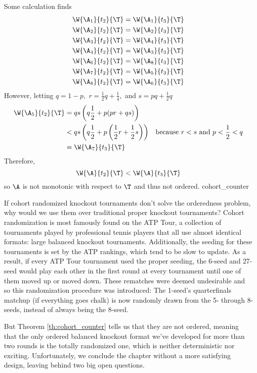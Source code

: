 {{        Some calculation finds
        \begin{align*}
            \W{\A_1}{t_2}{\T} &= \W{\A_1}{t_3}{\T}\\
            \W{\A_2}{t_2}{\T} &= \W{\A_2}{t_3}{\T}\\
            \W{\A_3}{t_2}{\T} &= \W{\A_4}{t_3}{\T}\\
            \W{\A_4}{t_2}{\T} &= \W{\A_3}{t_3}{\T}\\
            \W{\A_6}{t_2}{\T} &= \W{\A_8}{t_3}{\T}\\
            \W{\A_7}{t_2}{\T} &= \W{\A_5}{t_3}{\T}\\
            \W{\A_8}{t_2}{\T} &= \W{\A_6}{t_3}{\T}
        \end{align*}
        However, letting $q = 1- p,$ $r = \frac{1}{2}q + \frac{1}{4},$ and $s = pq + \frac{1}{2}q$
        \begin{align*}
            \W{\A_5}{t_2}{\T} &= qs\left(q\frac{1}{2}+p(pr + qs)\right)\\
            &<qs\left(q\frac{1}{2}+p\left(\frac{1}{2}r + \frac{1}{2}s\right)\right) &\textrm{because $r < s$ and $p < \frac{1}{2} < q$}\\
            &=\W{\A_7}{t_3}{\T} 
        \end{align*}
        Therefore, $$\W{\A}{t_2}{\T} < \W{\A}{t_3}{\T}$$ so $\A$ is not monotonic with respect to $\T$ and thus not ordered.
    }{cohort_counter}

    If cohort randomized knockout tournaments don't solve the orderedness problem, why would we use them over traditional proper knockout tournaments? Cohort randomization is most famously found on the ATP Tour, a collection of tournaments played by professional tennis players that all use almost identical formats: large balanced knockout tournaments. Additionally, the seeding for these tournaments is set by the ATP rankings, which tend to be slow to update. As a result, if every ATP Tour tournament used the proper seeding, the 6-seed and 27-seed would play each other in the first round at every tournament until one of them moved up or moved down. These rematches were deemed undesirable and so this randomization procedure was introduced: The 1-seed's quarterfinals matchup (if everything goes chalk) is now randomly drawn from the 5- through 8-seeds, instead of always being the 8-seed.

    But Theorem \ref{th:cohort_counter} tells us that they are not ordered, meaning that the only ordered balanced knockout format we've developed for more than two rounds is the totally randomized one, which is neither deterministic nor exciting. Unfortunately, we conclude the chapter without a more satisfying design, leaving behind two big open questions.
    
}
